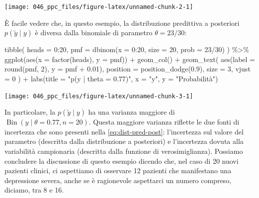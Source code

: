 \documentclass[
  10pt,
  italian,
  a4paper,
  extrafontsizes,onecolumn,openright
  ]{memoir}
\newenvironment{Shaded}{\begin{snugshade}}{\end{snugshade}}
\newcommand{\AttributeTok}[1]{\textcolor[rgb]{0.77,0.63,0.00}{#1}}
\newcommand{\DecValTok}[1]{\textcolor[rgb]{0.00,0.00,0.81}{#1}}
\newcommand{\FloatTok}[1]{\textcolor[rgb]{0.00,0.00,0.81}{#1}}
\newcommand{\FunctionTok}[1]{\textcolor[rgb]{0.00,0.00,0.00}{#1}}
\newcommand{\NormalTok}[1]{#1}
\newcommand{\SpecialCharTok}[1]{\textcolor[rgb]{0.00,0.00,0.00}{#1}}
\newcommand{\StringTok}[1]{\textcolor[rgb]{0.31,0.60,0.02}{#1}}
\DeclareMathOperator{\Bin}{Bin} %
\begin{document}
\begin{center}\texttt{[image: 046\_ppc\_files/figure-latex/unnamed-chunk-2-1]} \end{center}

È facile vedere che, in questo esempio, la distribuzione predittiva a posteriori \(p(\tilde{y} \mid y)\) è diversa dalla binomiale di parametro \(\theta = 23/30\):

\begin{Shaded}
\begin{Highlighting}[]
\FunctionTok{tibble}\NormalTok{(}
  \AttributeTok{heads =} \DecValTok{0}\SpecialCharTok{:}\DecValTok{20}\NormalTok{, }
  \AttributeTok{pmf =} \FunctionTok{dbinom}\NormalTok{(}\AttributeTok{x =} \DecValTok{0}\SpecialCharTok{:}\DecValTok{20}\NormalTok{, }\AttributeTok{size =} \DecValTok{20}\NormalTok{, }\AttributeTok{prob =} \DecValTok{23}\SpecialCharTok{/}\DecValTok{30}\NormalTok{)}
\NormalTok{) }\SpecialCharTok{\%\textgreater{}\%}
\FunctionTok{ggplot}\NormalTok{(}\FunctionTok{aes}\NormalTok{(}\AttributeTok{x =} \FunctionTok{factor}\NormalTok{(heads), }\AttributeTok{y =}\NormalTok{ pmf)) }\SpecialCharTok{+}
  \FunctionTok{geom\_col}\NormalTok{() }\SpecialCharTok{+}
  \FunctionTok{geom\_text}\NormalTok{(}
    \FunctionTok{aes}\NormalTok{(}\AttributeTok{label =} \FunctionTok{round}\NormalTok{(pmf, }\DecValTok{2}\NormalTok{), }\AttributeTok{y =}\NormalTok{ pmf }\SpecialCharTok{+} \FloatTok{0.01}\NormalTok{),}
    \AttributeTok{position =} \FunctionTok{position\_dodge}\NormalTok{(}\FloatTok{0.9}\NormalTok{),}
    \AttributeTok{size =} \DecValTok{3}\NormalTok{,}
    \AttributeTok{vjust =} \DecValTok{0}
\NormalTok{  ) }\SpecialCharTok{+}
  \FunctionTok{labs}\NormalTok{(}\AttributeTok{title =} \StringTok{"p(y | theta = 0.77)"}\NormalTok{,}
       \AttributeTok{x =} \StringTok{"y"}\NormalTok{,}
       \AttributeTok{y =} \StringTok{"Probabilità"}\NormalTok{) }
\end{Highlighting}
\end{Shaded}

\begin{center}\texttt{[image: 046\_ppc\_files/figure-latex/unnamed-chunk-3-1]} \end{center}

In particolare, la \(p(\tilde{y} \mid y)\) ha una varianza maggiore di \(\Bin(y \mid \theta = 0.77, n = 20)\). Questa maggiore varianza riflette le due fonti di incertezza che sono presenti nella \eqref{eq:dist-pred-post}: l'incertezza sul valore del parametro (descritta dalla distribuzione a posteriori) e l'incertezza dovuta alla variabilità campionaria (descritta dalla funzione di verosimiglianza).
Possiamo concludere la discussione di questo esempio dicendo che, nel caso di 20 nuovi pazienti clinici, ci aspettiamo di osservare 12 pazienti che manifestano una depressione severa, anche se è ragionevole aspettarci un numero compreso, diciamo, tra 8 e 16.
\end{document}
